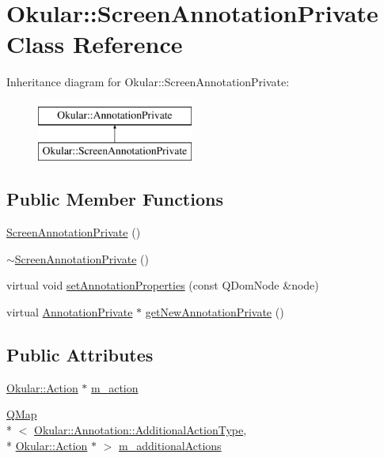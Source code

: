 \hypertarget{classOkular_1_1ScreenAnnotationPrivate}{\section{Okular\+:\+:Screen\+Annotation\+Private Class Reference}
\label{classOkular_1_1ScreenAnnotationPrivate}
}
Inheritance diagram for Okular\+:\+:Screen\+Annotation\+Private\+:\begin{figure}[H]
\begin{center}
\leavevmode
\includegraphics[height=2.000000cm]{classOkular_1_1ScreenAnnotationPrivate}
\end{center}
\end{figure}
\subsection*{Public Member Functions}
\begin{DoxyCompactItemize}
\item 
\hyperlink{classOkular_1_1ScreenAnnotationPrivate_a6f52b94e121f6730643d8765958852ec}{Screen\+Annotation\+Private} ()
\item 
\hyperlink{classOkular_1_1ScreenAnnotationPrivate_a53b83de30bc421553e6e1c777c18725b}{$\sim$\+Screen\+Annotation\+Private} ()
\item 
virtual void \hyperlink{classOkular_1_1ScreenAnnotationPrivate_a11389596826a67eb0c5a824815675adc}{set\+Annotation\+Properties} (const Q\+Dom\+Node \&node)
\item 
virtual \hyperlink{classOkular_1_1AnnotationPrivate}{Annotation\+Private} $\ast$ \hyperlink{classOkular_1_1ScreenAnnotationPrivate_a65892f7bf15e587b23e74b1702a73bf3}{get\+New\+Annotation\+Private} ()
\end{DoxyCompactItemize}
\subsection*{Public Attributes}
\begin{DoxyCompactItemize}
\item 
\hyperlink{classOkular_1_1Action}{Okular\+::\+Action} $\ast$ \hyperlink{classOkular_1_1ScreenAnnotationPrivate_aafed5fb8c9e503e70fc867f41c5e6978}{m\+\_\+action}
\item 
\hyperlink{classQMap}{Q\+Map}\\*
$<$ \hyperlink{classOkular_1_1Annotation_aa34152e337b1cb13e9327f37fc295057}{Okular\+::\+Annotation\+::\+Additional\+Action\+Type}, \\*
\hyperlink{classOkular_1_1Action}{Okular\+::\+Action} $\ast$ $>$ \hyperlink{classOkular_1_1ScreenAnnotationPrivate_a18cc906ba8755be93c5d5afea51758ad}{m\+\_\+additional\+Actions}
\end{DoxyCompactItemize}


